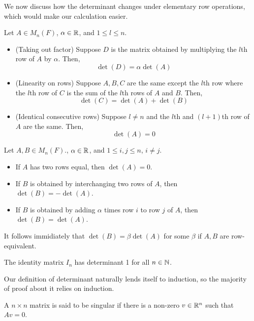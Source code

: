 \documentclass[11pt]{article}
\begin{document}
We now discuss how the determinant changes under elementary row operations, which would make our calculation easier.
\begin{proposition}
  Let \(A\in M_n(F)\), \(\alpha\in\mathbb{R}\), and \(1\leq l \leq n\).
  \begin{itemize}
    \item (Taking out factor) Suppose \(D\) is the matrix obtained by multiplying the \(l\)th row of \(A\) by \(\alpha\). Then,
    \[\det(D)=\alpha\det(A)\]
    \item (Linearity on rows) Suppose \(A,B,C\) are the same except the \(l\)th row where the \(l\)th row of \(C\) is the sum of the \(l\)th rows of \(A\) and \(B\). Then,
    \[\det(C)=\det(A)+\det(B)\]
    \item  (Identical consecutive rows) Suppose \(l\neq n\) and the \(l\)th and \((l+1)\)th row of \(A\) are the same. Then,
    \[\det(A)=0\]
  \end{itemize}
\end{proposition}

\begin{theorem}
  Let \(A,B\in M_n(F)\)., \(\alpha\in\mathbb{R}\), and \(1\leq i,j\leq n\), \(i\neq j\).
  \begin{itemize}
    \item If \(A\) has two rows equal, then \(\det(A)=0\).
    \item If \(B\) is obtained by interchanging two rows of \(A\), then \(\det(B)=-\det(A)\).
    \item If \(B\) is obtained by adding \(\alpha\) times row \(i\) to row \(j\) of \(A\), then \(\det(B)=\det(A)\).
  \end{itemize}
  It follows immidiately that \(\det(B)=\beta\det(A)\) for some \(\beta\) if \(A,B\) are row-equivalent.
\end{theorem}

\begin{theorem}
  The identity matrix \(I_n\) has determinant 1 for all \(n\in\mathbb{N}\).
\end{theorem}

\begin{remark}
  Our definition of determinant naturally lends itself to induction, so the majority of proof about it relies on induction.
\end{remark}

\begin{definition}
  A \(n\times n\) matrix is said to be singular if there is a non-zero \(v\in\mathbb{R}^n\) such that \(Av=0\).
\end{definition}
\end{document}
